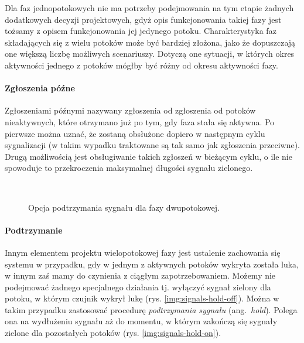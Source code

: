 \documentclass{pracamgr}
\newcommand{\ang}[1]{(ang.~\emph{#1})}
\theoremstyle{plain}
\begin{document}
Dla faz jednopotokowych nie ma potrzeby podejmowania na tym etapie
żadnych dodatkowych decyzji projektowych, gdyż opis funkcjonowania
takiej fazy jest tożsamy z opisem funkcjonowania jej jedynego
potoku. Charakterystyka faz składających się z wielu potoków może być
bardziej złożona, jako że dopuszczają one większą liczbę możliwych
scenariuszy. Dotyczą one sytuacji, w których okres aktywności jednego
z potoków mógłby być różny od okresu aktywności fazy.

\paragraph{Zgłoszenia późne} Zgłoszeniami późnymi nazywany zgłoszenia
od zgłoszenia od potoków nieaktywnych, które otrzymano już po tym, gdy
faza stała się aktywna. Po pierwsze można uznać, że zostaną obsłużone
dopiero w następnym cyklu sygnalizacji (w takim wypadku traktowane są
tak samo jak zgłoszenia przeciwne). Drugą możliwością jest
obsługiwanie takich zgłoszeń w bieżącym cyklu, o ile nie spowoduje to
przekroczenia maksymalnej długości sygnału zielonego.
\begin{figure}
  \centering
  \\\vspace{0.5cm}
  \caption{Opcja podtrzymania sygnału dla fazy dwupotokowej.}
\end{figure}
\paragraph{Podtrzymanie} Innym elementem projektu wielopotokowej fazy
jest ustalenie zachowania się systemu w przypadku, gdy w jednym z
aktywnych potoków wykryta została luka, w innym zaś mamy do czynienia
z ciągłym zapotrzebowaniem. Możemy nie podejmować żadnego specjalnego
działania tj. wyłączyć sygnał zielony dla potoku, w którym czujnik
wykrył lukę (rys. \ref{img:signals-hold-off}).  Można w takim przypadku
zastosować procedurę \emph{podtrzymania sygnału} \ang{hold}. Polega
ona na wydłużeniu sygnału aż do momentu, w którym zakończą się sygnały
zielone dla pozostałych potoków (rys. \ref{img:signals-hold-on}).
\end{document}
